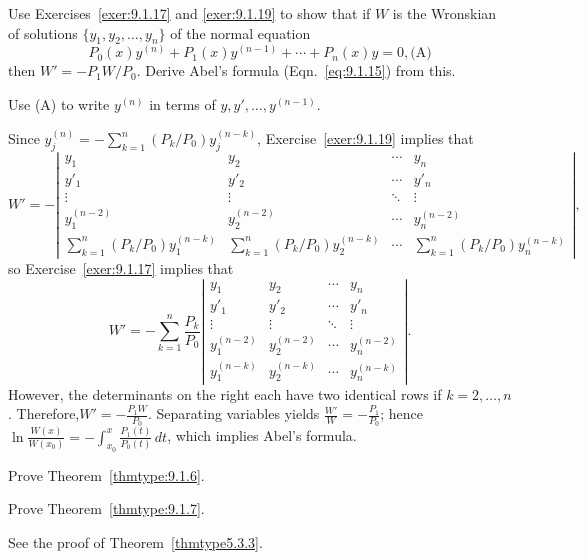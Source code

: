 \documentclass{ximera}
\begin{document}
\begin{problem}\label{exer:9.1.20}
Use Exercises~\ref{exer:9.1.17} and \ref{exer:9.1.19} to show that if $W$ is
the Wronskian
of  solutions $\{y_1,y_2,\dots,y_n\}$ of the normal equation
$$
P_0(x)y^{(n)}+P_1(x)y^{(n-1)}+\cdots+P_n(x)y=0,
\text{(A)}
$$
then $W'=-P_1W/P_0$.
Derive Abel's formula (Eqn.~\eqref{eq:9.1.15}) from this.
\begin{hint}
Use (A) to write $y^{(n)}$ in terms of
$y,y',\dots,y^{(n-1)}$.
\end{hint}

\begin{solution}
Since $y_j^{(n)}=-\sum_{k=1}^n(P_k/P_0)y_j^{(n-k)}$,
Exercise~\ref{exer:9.1.19} implies that
$$
W'=-
\left|\begin{array}{cccc}
y_1&y_2&\cdots&y_n\\ 
y'_1&y'_2&\cdots&y'_n\\ 
\vdots&\vdots&\ddots&\vdots\\ 
y_1^{(n-2)}&y_2^{(n-2)}&\cdots&y_n^{(n-2)}\\ 
\sum_{k=1}^n(P_k/P_0)y_1^{(n-k)}&
\sum_{k=1}^n(P_k/P_0)y_2^{(n-k)}&\cdots&
\sum_{k=1}^n(P_k/P_0)y_n^{(n-k)}
\end{array}\right|,
$$
so Exercise~\ref{exer:9.1.17} implies that
$$
W'=-\sum_{k=1}^n\frac{P_k}{P_0}
\left|\begin{array}{cccc}
y_1&y_2&\cdots&y_n\\ 
y'_1&y'_2&\cdots&y'_n\\ 
\vdots&\vdots&\ddots&\vdots\\ 
y_1^{(n-2)}&y_2^{(n-2)}&\cdots&y_n^{(n-2)}\\ 
y_1^{(n-k)}&
y_2^{(n-k)}&\cdots&
y_n^{(n-k)}
\end{array}\right|.
$$
However, the determinants on the right each have two identical rows
if $k=2,\dots,n$. Therefore,$W'=-\frac{P_1W}{P_0}$.  Separating
variables yields $\frac{W'}{W}=-\frac{P_1}{P_0}$; hence
$\ln \frac{W(x)}{W(x_0)}=-\int_{x_0}^x \frac{P_1(t)}{P_0(t)}\,dt$, which implies Abel's formula.
\end{solution}
\end{problem}

\begin{problem}\label{exer:9.1.21}  Prove Theorem~\ref{thmtype:9.1.6}.
\end{problem}

\begin{problem}\label{exer:9.1.22}  Prove Theorem~\ref{thmtype:9.1.7}.

\begin{solution}
See the proof of Theorem~\ref{thmtype5.3.3}.
\end{solution}
\end{problem}
\end{document}
